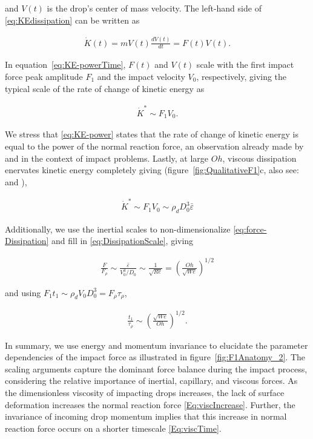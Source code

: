 \documentclass{jfm}
\begin{document}
	\noindent and $V(t)$ is the drop's center of mass velocity. The left-hand side of \eqref{eq:KEdissipation} can be written as
	
	\begin{align}\label{eq:KE-powerTime}
		\dot{K}(t) = mV(t)\frac{dV(t)}{dt} = F(t)V(t).
	\end{align}
	
	\noindent In equation~\eqref{eq:KE-powerTime}, $F(t)$ and $V(t)$ scale with the first impact force peak amplitude $F_1$ and the impact velocity $V_0$, respectively, giving the typical scale of the rate of change of kinetic energy as
	
	\begin{align}\label{eq:KE-power}
		\dot{K}^* \sim F_1V_0.
	\end{align}
	
	\noindent We stress that \eqref{eq:KE-power} states that the rate of change of kinetic energy is equal to the power of the normal reaction force, an observation already made by \citet{wagner1932stoss} and \citet{Philippi2016} in the context of impact problems. Lastly, at large $Oh$, viscous dissipation enervates kinetic energy completely giving (figure~\ref{fig:QualitativeF1}c, also see:  \citet{Philippi2016} and \citet{ Wildeman2016}),
	
	\begin{align}\label{eq:force-Dissipation}
		\dot{K}^* \sim F_1V_0 \sim \rho_dD_0^3\bar{\varepsilon}
	\end{align}
	
	\noindent Additionally, we use the inertial scales to non-dimensionalize  \eqref{eq:force-Dissipation} and fill in \eqref{eq:DissipationScale}, giving
	
	\begin{align}
		\label{Eq:viscIncrease}
		\frac{F}{F_\rho} \sim \frac{\bar{\varepsilon}}{V_0^3/D_0} \sim \frac{1}{\sqrt{Re}} = \left(\frac{Oh}{\sqrt{We}}\right)^{1/2}
	\end{align}
	
	\noindent and using $F_1t_1 \sim \rho_dV_0D_0^3 = F_\rho\tau_\rho$,
	
	\begin{align}
		\label{Eq:viscTime}
		\frac{t_1}{\tau_\rho} \sim \left(\frac{\sqrt{We}}{Oh}\right)^{1/2}.
	\end{align}
	
	In summary, we use energy and momentum invariance to elucidate the parameter dependencies of the impact force as illustrated in figure~\ref{fig:F1Anatomy_2}. The scaling arguments capture the dominant force balance during the impact process, considering the relative importance of inertial, capillary, and viscous forces. As the dimensionless viscosity of impacting drops increases, the lack of surface deformation increases the normal reaction force \eqref{Eq:viscIncrease}. Further, the invariance of incoming drop momentum implies that this increase in normal reaction force occurs on a shorter timescale \eqref{Eq:viscTime}.
	
\end{document}
